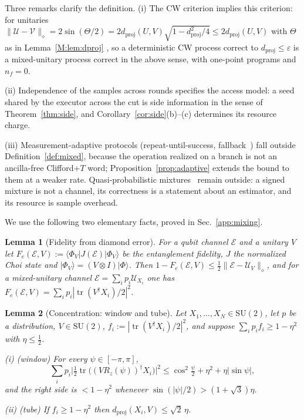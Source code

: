 \documentclass[aps,prx,twocolumn,superscriptaddress,nofootinbib,longbibliography]{revtex4-2}
\theoremstyle{plain}
\newtheorem{lemma}{Lemma}
\theoremstyle{definition}
\theoremstyle{remark}
\newcommand{\dproj}{d_{\mathrm{proj}}}
\newcommand{\SU}{\mathrm{SU}(2)}
\newcommand{\tr}{\operatorname{tr}}
\begin{document}
Three remarks clarify the definition. (i) The CW criterion implies this criterion: for unitaries $\|\mathcal U-\mathcal V\|_\diamond=2\sin(\Theta/2)=2\dproj(U,V)\sqrt{1-\dproj^2/4}\le2\dproj(U,V)$ with $\Theta$ as in Lemma~\ref{M:lem:dproj} \cite[Thm.~3.55]{Watrous}, so a deterministic CW process correct to $\dproj\le\varepsilon$ is a mixed-unitary process correct in the above sense, with one-point programs and $n_f=0$. 

(ii) Independence of the samples across rounds specifies the access model: a seed shared by the executor across the cut is side information in the sense of Theorem~\ref{thm:side}, and Corollary~\ref{cor:side}(b)--(c) determines its resource charge. 

(iii) Measurement-adaptive protocols (repeat-until-success, fallback~\cite{BRS,KLMPP}) fall outside Definition~\ref{def:mixed}, because the operation realized on a branch is not an ancilla-free Clifford+$T$ word; Proposition~\ref{prop:adaptive} extends the bound to them at a weaker rate. Quasi-probabilistic mixtures~\cite{Bothe} remain outside: a signed mixture is not a channel, its correctness is a statement about an estimator, and its resource is sample overhead.

We use the following two elementary facts, proved in Sec.~\ref{app:mixing}.

\begin{lemma}[Fidelity from diamond error]\label{lem:fid}
For a qubit channel $\mathcal E$ and a unitary $V$ let $F_e(\mathcal E,V):=\langle\Phi_V|J(\mathcal E)|\Phi_V\rangle$ be the entanglement fidelity, $J$ the normalized Choi state and $|\Phi_V\rangle=(V\otimes I)|\Phi\rangle$. Then $1-F_e(\mathcal E,V)\le\tfrac12\|\mathcal E-\mathcal U_V\|_\diamond$, and for a mixed-unitary channel $\mathcal E=\sum_ip_i\mathcal U_{X_i}$ one has $F_e(\mathcal E,V)=\sum_ip_i|\tr(V^\dagger X_i)/2|^2$.
\end{lemma}

\begin{lemma}[Concentration: window and tube]\label{lem:conc}
Let $X_1,\dots,X_N\in\SU$, let $p$ be a distribution, $V\in\SU$, $f_i:=|\tr(V^\dagger X_i)/2|^2$, and suppose $\sum_ip_if_i\ge1-\eta^2$ with $\eta\le\tfrac12$.

(i) \emph{(window)} For every $\psi\in[-\pi,\pi]$,
\begin{equation}\label{eq:window}
\sum_ip_i\Big|\tfrac12\tr\big((VR_z(\psi))^\dagger X_i\big)\Big|^2\le\cos^2\tfrac\psi2+\eta^2+\eta|\sin\psi|,
\end{equation}
and the right side is $<1-\eta^2$ whenever $\sin(|\psi|/2)>(1+\sqrt3)\eta$.

(ii) \emph{(tube)} If $f_i\ge1-\eta^2$ then $\dproj(X_i,V)\le\sqrt2\,\eta$.
\end{lemma}
\end{document}
